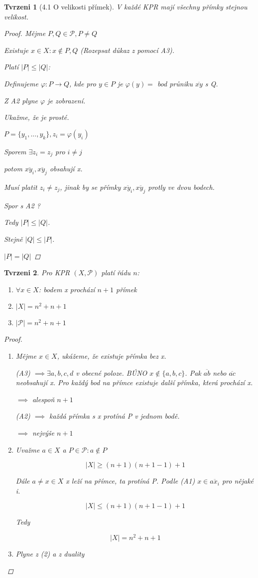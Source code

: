 \documentclass[10pt,a4paper]{article}
\theoremstyle{plain}
\newtheorem*{tvrzeni}{Tvrzeni}
\begin{document}
\begin{tvrzeni}[4.1  O velikosti přímek]
V každé KPR mají všechny přímky stejnou velikost.
\begin{proof}
Mějme $P,Q \in \mathcal{P}, P \neq Q$

Existuje $x \in X: x \notin P, Q$ (Rozepsat důkaz z pomocí A3).

Platí $|P| \leq |Q|$:

Definujeme $\varphi: P \to Q$, kde pro $y \in P$ je $\varphi(y) =$ bod průniku $\overline{xy}$ s Q.

Z A2 plyne $\varphi$ je zobrazení.

Ukažme, že je prosté.

$P = \{y_1,...,y_k\}, z_i = \varphi(y_i)$

Sporem $\exists z_i = z_j$ pro $i \neq j$

potom $\overline{xy_i}, \overline{xy_j}$ obsahují x.

Musí platit $z_i \neq z_j$, jinak by se přímky $\overline{xy_i}, \overline{xy_j}$ protly ve dvou bodech.

Spor s A2 ?

Tedy $|P| \leq |Q|$.

Stejně $|Q| \leq |P|$.

$|P| = |Q|$
\end{proof}
\end{tvrzeni}

\begin{tvrzeni}
Pro KPR $(X, \mathcal{P})$ platí řádu $n$:
\begin{enumerate}
\item $\forall x \in X$: bodem x prochází $n+1$ přímek
\item $|X| = n^2 + n+ 1$
\item $|\mathcal{P}| = n^2 + n+ 1$
\end{enumerate}
\begin{proof}
\begin{enumerate}
\item Mějme $x \in X$, ukážeme, že existuje přímka bez x. 

(A3) $\implies \exists a,b,c,d$ v obecné poloze. BÚNO $x \notin \{a,b,c\}$. Pak $\overline{ab}$ nebo $\overline{ac}$ neobsahují x. Pro každý bod na přímce existuje další přímka, která prochází x.

$\implies$ alespoň $n+1$

(A2) $\implies$ každá přímka s x protíná P v jednom bodě.

$\implies$ nejvýše $n+1$
\item Uvažme $a \in X$ a $P \in \mathcal{P}: a \notin P$

\[ |X| \geq (n+1)(n+1-1) + 1\]

Dále $a \neq x \in X$ x leží na přímce, ta protíná P. Podle (A1) $x \in \overline{ax_i}$ pro nějaké i.

\[ |X| \leq (n+1)(n+1-1) + 1\]

Tedy 

\[ |X| = n^2 + n+1\]

\item Plyne z (2) a z duality
\end{enumerate}
\end{proof}
\end{tvrzeni}
\end{document}
